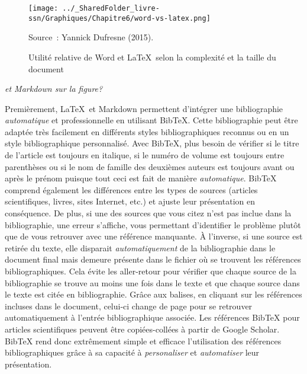 \documentclass[
  letterpaper,
  DIV=11,
  numbers=noendperiod]{scrreprt}
\begin{document}
\begin{figure}
\begin{center}
\caption{Utilité relative de Word et \LaTeX\ selon la complexité et la taille du document \label{latex-vs-word}}
\texttt{[image: ../\_SharedFolder\_livre-ssn/Graphiques/Chapitre6/word-vs-latex.png]}
\end{center}
\footnotesize{Source~: Yannick Dufresne (2015).}
\end{figure}

\emph{et Markdown sur la figure?}

Premièrement, \LaTeX~et Markdown permettent d'intégrer une bibliographie
\emph{automatique} et professionnelle en utilisant BibTeX. Cette
bibliographie peut être adaptée très facilement en différents styles
bibliographiques reconnus ou en un style bibliographique personnalisé.
Avec BibTeX, plus besoin de vérifier si le titre de l'article est
toujours en italique, si le numéro de volume est toujours entre
parenthèses ou si le nom de famille des deuxièmes auteurs est toujours
avant ou après le prénom puisque tout ceci est fait de manière
\emph{automatique}. BibTeX comprend également les différences entre les
types de sources (articles scientifiques, livres, sites Internet, etc.)
et ajuste leur présentation en conséquence. De plus, si une des sources
que vous citez n'est pas inclue dans la bibliographie, une erreur
s'affiche, vous permettant d'identifier le problème plutôt que de vous
retrouver avec une référence manquante. À l'inverse, si une source est
retirée du texte, elle disparait \emph{automatiquement} de la
bibliographie dans le document final mais demeure présente dans le
fichier où se trouvent les références bibliographiques. Cela évite les
aller-retour pour vérifier que chaque source de la bibliographie se
trouve au moins une fois dans le texte et que chaque source dans le
texte est citée en bibliographie. Grâce aux balises, en cliquant sur les
références incluses dans le document, celui-ci change de page pour se
retrouver automatiquement à l'entrée bibliographique associée. Les
références BibTeX pour articles scientifiques peuvent être
copiées-collées à partir de Google Scholar. BibTeX rend donc extrêmement
simple et efficace l'utilisation des références bibliographiques grâce à
sa capacité à \emph{personaliser} et \emph{automatiser} leur
présentation.
\end{document}
